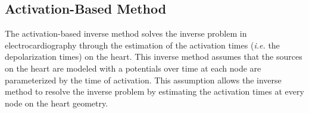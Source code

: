     



   
\subsection{Activation-Based Method}
    
    The activation-based inverse method solves the inverse problem in electrocardiography through the estimation of the activation times (\emph{i.e.} the depolarization times) on the heart.
    This inverse method assumes that the sources on the heart are modeled with a potentials over time at each node are parameterized  by the time of activation.
    This assumption allows the inverse method to resolve the inverse problem by estimating the activation times at every node on the heart geometry.
    
